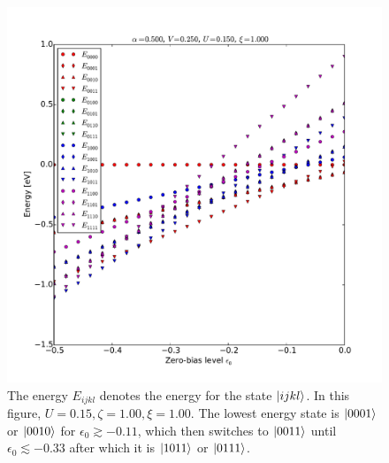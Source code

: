 \begin{figure}[h]
    \centering
    \includegraphics[height=.45\textheight]{pdf/energy/pespin_distribution_u2_k2.pdf}
    \caption{The energy $E_{ijkl}$ denotes the energy for the state $\ket{ijkl}$. In this figure, $U=0.15, \zeta=1.00, \xi=1.00$. The lowest energy state is $\ket{0001}$ or $\ket{0010}$ for $\epsilon_0\gtrsim -0.11$, which then switches to $\ket{0011}$ until $\epsilon_0\lesssim -0.33$ after which it is $\ket{1011}$ or $\ket{0111}$.}
    \label{fig:perspinenergy22}
\end{figure} 
